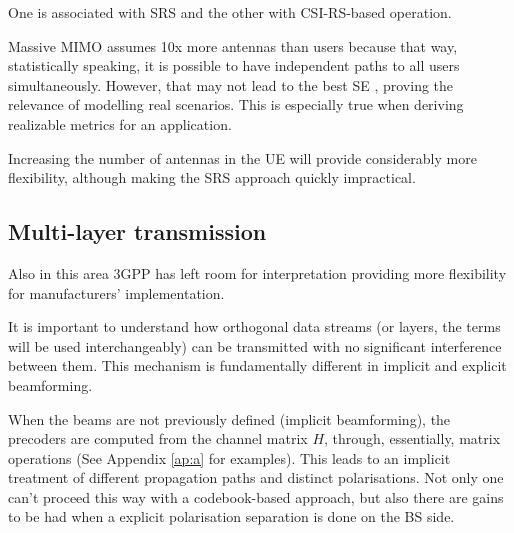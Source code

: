 

One is associated with SRS and the other with CSI-RS-based operation.





Massive MIMO assumes 10x more antennas than users because that way, statistically speaking, it is possible to have independent paths to all users simultaneously. However, that may not lead to the best \ac{SE} \cite{7294693}, proving the relevance of modelling real scenarios. This is especially true when deriving realizable metrics for an application. 

Increasing the number of antennas in the UE will provide considerably more flexibility, although making the SRS approach quickly impractical.






\subsection*{Multi-layer transmission}

Also in this area 3GPP has left room for interpretation providing more flexibility for manufacturers' implementation.

It is important to understand how orthogonal data streams (or layers, the terms will be used interchangeably) can be transmitted with no significant interference between them. This mechanism is fundamentally different in implicit and explicit beamforming.

When the beams are not previously defined (implicit beamforming), the precoders are computed from the channel matrix $H$, through, essentially, matrix operations (See Appendix \ref{ap:a} for examples). This leads to an implicit treatment of different propagation paths and distinct polarisations. Not only one can't proceed this way with a codebook-based approach, but also there are gains to be had when a explicit polarisation separation is done on the BS side.

